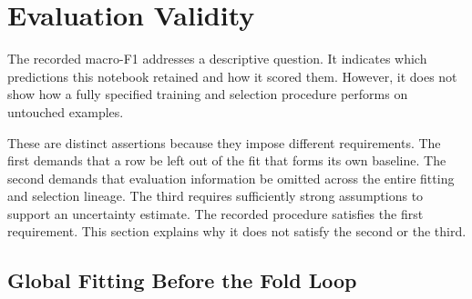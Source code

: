 \documentclass[runningheads]{llncs}
\begin{document}















\section{Evaluation Validity}
\label{sec:validity}

The recorded macro-F1 addresses a descriptive question. It indicates which predictions this notebook retained and how it scored them. However, it does not show how a fully specified training and selection procedure performs on untouched examples.

These are distinct assertions because they impose different requirements. The first demands that a row be left out of the fit that forms its own baseline. The second demands that evaluation information be omitted across the entire fitting and selection lineage. The third requires sufficiently strong assumptions to support an uncertainty estimate. The recorded procedure satisfies the first requirement. This section explains why it does not satisfy the second or the third.

\subsection{Global Fitting Before the Fold Loop}
\end{document}
